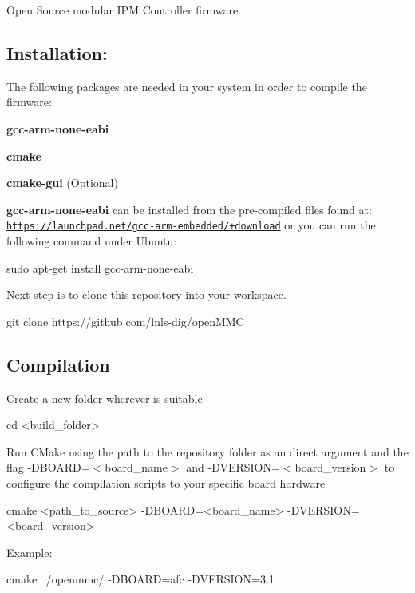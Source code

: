 Open Source modular I\-P\-M Controller firmware

\subsection*{Installation\-:}

The following packages are needed in your system in order to compile the firmware\-:
\begin{DoxyItemize}
\item {\bfseries gcc-\/arm-\/none-\/eabi}
\item {\bfseries cmake}
\item {\bfseries cmake-\/gui} (Optional)
\end{DoxyItemize}

{\bfseries gcc-\/arm-\/none-\/eabi} can be installed from the pre-\/compiled files found at\-: \href{https://launchpad.net/gcc-arm-embedded/+download}{\tt https\-://launchpad.\-net/gcc-\/arm-\/embedded/+download} or you can run the following command under Ubuntu\-: \begin{DoxyVerb}sudo apt-get install gcc-arm-none-eabi
\end{DoxyVerb}


Next step is to clone this repository into your workspace. \begin{DoxyVerb}git clone https://github.com/lnls-dig/openMMC
\end{DoxyVerb}


\subsection*{Compilation}

Create a new folder wherever is suitable \begin{DoxyVerb}cd <build_folder>
\end{DoxyVerb}


Run C\-Make using the path to the repository folder as an direct argument and the flag {\ttfamily -\/\-D\-B\-O\-A\-R\-D=$<$board\-\_\-name$>$} and {\ttfamily -\/\-D\-V\-E\-R\-S\-I\-O\-N=$<$board\-\_\-version$>$} to configure the compilation scripts to your specific board hardware \begin{DoxyVerb}cmake <path_to_source> -DBOARD=<board_name> -DVERSION=<board_version>
\end{DoxyVerb}


Example\-: \begin{DoxyVerb}cmake ~/openmmc/ -DBOARD=afc -DVERSION=3.1
\end{DoxyVerb}


